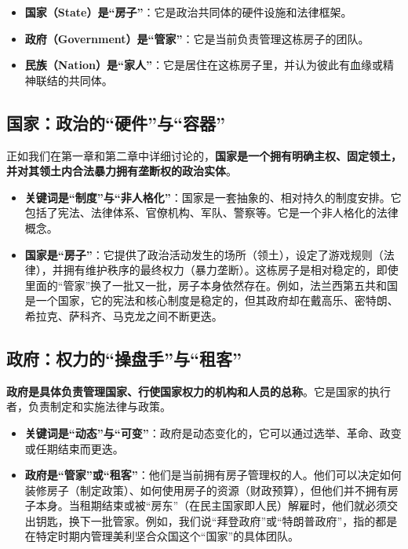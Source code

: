 \begin{itemize}[noitemsep,topsep=0pt]
    \item \textbf{国家（State）是“房子”}：它是政治共同体的硬件设施和法律框架。
    \item \textbf{政府（Government）是“管家”}：它是当前负责管理这栋房子的团队。
    \item \textbf{民族（Nation）是“家人”}：它是居住在这栋房子里，并认为彼此有血缘或精神联结的共同体。
\end{itemize}

\subsection{国家：政治的“硬件”与“容器”}

正如我们在第一章和第二章中详细讨论的，\textbf{国家是一个拥有明确主权、固定领土，并对其领土内合法暴力拥有垄断权的政治实体}。

\begin{itemize}[noitemsep,topsep=0pt]
    \item \textbf{关键词是“制度”与“非人格化”}：国家是一套抽象的、相对持久的制度安排。它包括了宪法、法律体系、官僚机构、军队、警察等。它是一个非人格化的法律概念。
    \item \textbf{国家是“房子”}：它提供了政治活动发生的场所（领土），设定了游戏规则（法律），并拥有维护秩序的最终权力（暴力垄断）。这栋房子是相对稳定的，即使里面的“管家”换了一批又一批，房子本身依然存在。例如，法兰西第五共和国是一个国家，它的宪法和核心制度是稳定的，但其政府却在戴高乐、密特朗、希拉克、萨科齐、马克龙之间不断更迭。
\end{itemize}

\subsection{政府：权力的“操盘手”与“租客”}

\textbf{政府是具体负责管理国家、行使国家权力的机构和人员的总称}。它是国家的执行者，负责制定和实施法律与政策。

\begin{itemize}[noitemsep,topsep=0pt]
    \item \textbf{关键词是“动态”与“可变”}：政府是动态变化的，它可以通过选举、革命、政变或任期结束而更迭。
    \item \textbf{政府是“管家”或“租客”}：他们是当前拥有房子管理权的人。他们可以决定如何装修房子（制定政策）、如何使用房子的资源（财政预算），但他们并不拥有房子本身。当租期结束或被“房东”（在民主国家即人民）解雇时，他们就必须交出钥匙，换下一批管家。例如，我们说“拜登政府”或“特朗普政府”，指的都是在特定时期内管理美利坚合众国这个“国家”的具体团队。
\end{itemize}

